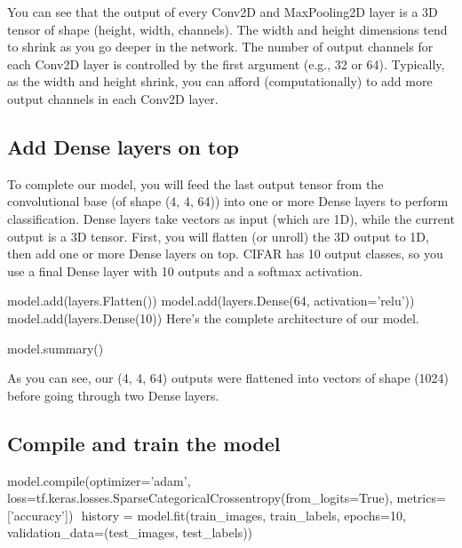 \documentclass[%
oneside,                 %
final,                   %
10pt]{article}
\begin{document}
You can see that the output of every Conv2D and MaxPooling2D layer is a 3D tensor of shape (height, width, channels). The width and height dimensions tend to shrink as you go deeper in the network. The number of output channels for each Conv2D layer is controlled by the first argument (e.g., 32 or 64). Typically, as the width and height shrink, you can afford (computationally) to add more output channels in each Conv2D layer.

\subsection{Add Dense layers on top}

To complete our model, you will feed the last output tensor from the
convolutional base (of shape (4, 4, 64)) into one or more Dense layers
to perform classification. Dense layers take vectors as input (which
are 1D), while the current output is a 3D tensor. First, you will
flatten (or unroll) the 3D output to 1D, then add one or more Dense
layers on top. CIFAR has 10 output classes, so you use a final Dense
layer with 10 outputs and a softmax activation.








\bpycod
model.add(layers.Flatten())
model.add(layers.Dense(64, activation='relu'))
model.add(layers.Dense(10))
Here's the complete architecture of our model.

model.summary()

\epycod

As you can see, our (4, 4, 64) outputs were flattened into vectors of shape (1024) before going through two Dense layers.

\subsection{Compile and train the model}









\bpycod
model.compile(optimizer='adam',
              loss=tf.keras.losses.SparseCategoricalCrossentropy(from_logits=True),
              metrics=['accuracy'])
​
history = model.fit(train_images, train_labels, epochs=10, 
                    validation_data=(test_images, test_labels))


\epycod
\end{document}

